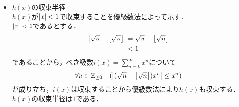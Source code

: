 \begin{enumerate}[(1)]
\begin{itemize}
        \item $h(x)$の収束半径\\
        $h(x)$が$\abs{x}<1$で収束することを優級数法によって示す．\\
        $\abs{x}<1$であるとする．
        \begin{align}
            \abs{\sqrt{n}-\qty[\sqrt{n}]}
            &=\sqrt{n}-\qty[\sqrt{n}]\\
            &<1
        \end{align}
        であることから，べき級数$i(x)=\displaystyle\sum_{n=0}^\infty x^n$について
        \begin{equation}
            \forall n\in \mathbb{Z}_{\ge 0} \quad (\abs{(\sqrt{n}-\qty[\sqrt{n}])x^n}\le x^n)
        \end{equation}
        が成り立ち，$i(x)$は収束することから優級数法により$h(x)$も収束する．$h(x)$の収束半径は$1$である．
    \end{itemize}
\end{enumerate}


